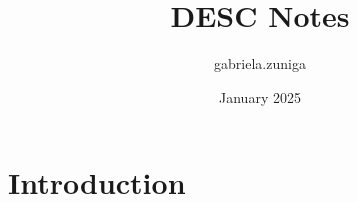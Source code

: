 \documentclass{article}
\title{DESC Notes}
\author{gabriela.zuniga }
\date{January 2025}
\begin{document}
\maketitle

\section{Introduction}
\end{document}
